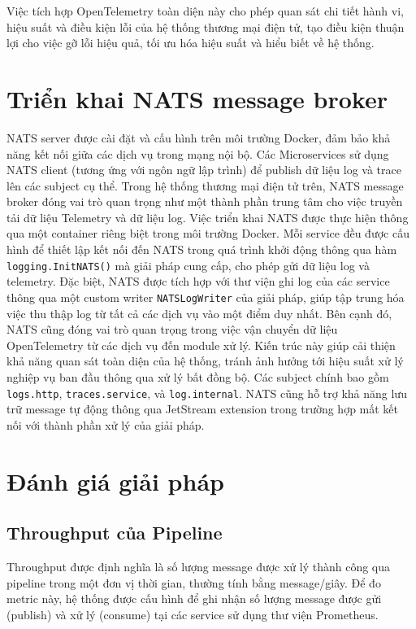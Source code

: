 \documentclass{uetgraduation}
\begin{document}
Việc tích hợp OpenTelemetry toàn diện này cho phép quan sát chi tiết hành vi, hiệu suất và điều kiện lỗi của hệ thống thương mại điện tử, tạo điều kiện thuận lợi cho việc gỡ lỗi hiệu quả, tối ưu hóa hiệu suất và hiểu biết về hệ thống.

\section{Triển khai NATS message broker}

NATS server được cài đặt và cấu hình trên môi trường Docker, đảm bảo khả năng kết nối giữa các dịch vụ trong mạng nội bộ. Các Microservices sử dụng NATS client (tương ứng với ngôn ngữ lập trình) để publish dữ liệu log và trace lên các subject cụ thể. Trong hệ thống thương mại điện tử trên, NATS message broker đóng vai trò quan trọng như một thành phần trung tâm cho việc truyền tải dữ liệu Telemetry và dữ liệu log. Việc triển khai NATS được thực hiện thông qua một container riêng biệt trong môi trường Docker. Mỗi service đều được cấu hình để thiết lập kết nối đến NATS trong quá trình khởi động thông qua hàm \texttt{logging.InitNATS()} mà giải pháp cung cấp, cho phép gửi dữ liệu log và telemetry. Đặc biệt, NATS được tích hợp với thư viện ghi log của các service thông qua một custom writer \texttt{NATSLogWriter} của giải pháp, giúp tập trung hóa việc thu thập log từ tất cả các dịch vụ vào một điểm duy nhất. Bên cạnh đó, NATS cũng đóng vai trò quan trọng trong việc vận chuyển dữ liệu OpenTelemetry từ các dịch vụ đến module xử lý. Kiến trúc này giúp cải thiện khả năng quan sát toàn diện của hệ thống, tránh ảnh hưởng tới hiệu suất xử lý nghiệp vụ ban đầu thông qua xử lý bất đồng bộ. Các subject chính bao gồm \texttt{logs.http}, \texttt{traces.service}, và \texttt{log.internal}. NATS cũng hỗ trợ khả năng lưu trữ message tự động thông qua JetStream extension trong trường hợp mất kết nối với thành phần xử lý của giải pháp.

\section{Đánh giá giải pháp}

\subsection{Throughput của Pipeline}
Throughput được định nghĩa là số lượng message được xử lý thành công qua pipeline trong một đơn vị thời gian, thường tính bằng message/giây. Để đo metric này, hệ thống được cấu hình để ghi nhận số lượng message được gửi (publish) và xử lý (consume) tại các service sử dụng thư viện Prometheus.
\end{document}
